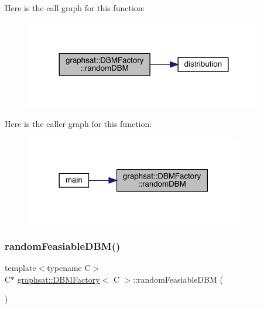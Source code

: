 Here is the call graph for this function\+:
\nopagebreak
\begin{figure}[H]
\begin{center}
\leavevmode
\includegraphics[width=296pt]{classgraphsat_1_1_d_b_m_factory_a4870799258dd6b425fec20603924ffb4_cgraph}
\end{center}
\end{figure}
Here is the caller graph for this function\+:
\nopagebreak
\begin{figure}[H]
\begin{center}
\leavevmode
\includegraphics[width=270pt]{classgraphsat_1_1_d_b_m_factory_a4870799258dd6b425fec20603924ffb4_icgraph}
\end{center}
\end{figure}
\mbox{\label{classgraphsat_1_1_d_b_m_factory_a900f72a3876daf4cd4142a3704873025}} 
\subsubsection{\texorpdfstring{randomFeasiableDBM()}{randomFeasiableDBM()}}
{\footnotesize\ttfamily template$<$typename C$>$ \\
C$\ast$ \mbox{\hyperlink{classgraphsat_1_1_d_b_m_factory}{graphsat\+::\+D\+B\+M\+Factory}}$<$ C $>$\+::random\+Feasiable\+D\+BM (\begin{DoxyParamCaption}{ }\end{DoxyParamCaption})\hspace{0.3cm}{\ttfamily [inline]}}

